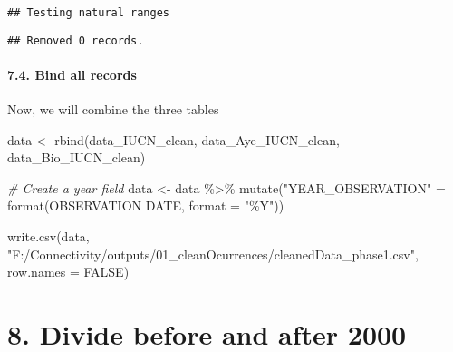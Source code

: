 \documentclass[
]{article}
\newenvironment{Shaded}{\begin{snugshade}}{\end{snugshade}}
\newcommand{\AttributeTok}[1]{\textcolor[rgb]{0.77,0.63,0.00}{#1}}
\newcommand{\CommentTok}[1]{\textcolor[rgb]{0.56,0.35,0.01}{\textit{#1}}}
\newcommand{\ConstantTok}[1]{\textcolor[rgb]{0.00,0.00,0.00}{#1}}
\newcommand{\FunctionTok}[1]{\textcolor[rgb]{0.00,0.00,0.00}{#1}}
\newcommand{\NormalTok}[1]{#1}
\newcommand{\OtherTok}[1]{\textcolor[rgb]{0.56,0.35,0.01}{#1}}
\newcommand{\SpecialCharTok}[1]{\textcolor[rgb]{0.00,0.00,0.00}{#1}}
\newcommand{\StringTok}[1]{\textcolor[rgb]{0.31,0.60,0.02}{#1}}
\begin{document}
\begin{verbatim}
## Testing natural ranges
\end{verbatim}

\begin{verbatim}
## Removed 0 records.
\end{verbatim}

\hypertarget{bind-all-records}{%
\paragraph{7.4. Bind all records}\label{bind-all-records}}

Now, we will combine the three tables

\begin{Shaded}
\begin{Highlighting}[]
\NormalTok{data }\OtherTok{\textless{}{-}} \FunctionTok{rbind}\NormalTok{(data\_IUCN\_clean, data\_Aye\_IUCN\_clean, data\_Bio\_IUCN\_clean)}
\end{Highlighting}
\end{Shaded}

\begin{Shaded}
\begin{Highlighting}[]
\CommentTok{\# Create a year field }
\NormalTok{data }\OtherTok{\textless{}{-}}\NormalTok{ data }\SpecialCharTok{\%\textgreater{}\%} \FunctionTok{mutate}\NormalTok{(}\StringTok{"YEAR\_OBSERVATION"} \OtherTok{=} \FunctionTok{format}\NormalTok{(}\StringTok{\textasciigrave{}}\AttributeTok{OBSERVATION DATE}\StringTok{\textasciigrave{}}\NormalTok{, }\AttributeTok{format =} \StringTok{"\%Y"}\NormalTok{))}

\FunctionTok{write.csv}\NormalTok{(data, }\StringTok{"F:/Connectivity/outputs/01\_cleanOcurrences/cleanedData\_phase1.csv"}\NormalTok{, }\AttributeTok{row.names =} \ConstantTok{FALSE}\NormalTok{)}
\end{Highlighting}
\end{Shaded}

\hypertarget{divide-before-and-after-2000}{%
\section{8. Divide before and after
2000}\label{divide-before-and-after-2000}}
\end{document}
